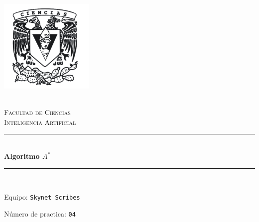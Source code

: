 \begin{titlepage}
\center 
\newcommand{\HRule}{\rule{\linewidth}{0.5mm}} 

\includegraphics[width=4.5cm]{IMA/cienciasWhite.png}

\quad \\[0.2cm]
\textsc{\huge Facultad de Ciencias}\\[.6cm] 
\textsc{\huge Inteligencia Artificial}\\[0.5cm]

\makeatletter
    \HRule \\ [0.4cm]
        { \huge \bfseries Algoritmo $A^{*}$}\\
    \HRule \\ [0.4cm]
    
\vspace{2mm}

\begin{flushleft}
    \Large{Equipo:} \texttt{\Large Skynet Scribes}
\end{flushleft}
\begin{flushleft}
    \Large{Número de practica:} \texttt{\Large 04}\\[0.8cm]
\end{flushleft}


\begin{minipage}{0.8\textwidth}
    \begin{flushright}
            
    \end{flushright}
\end{minipage}    


\end{titlepage}
